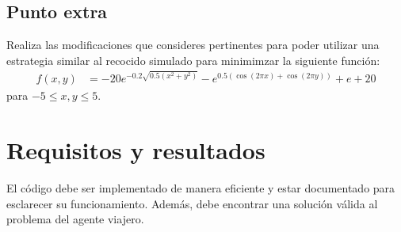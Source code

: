 \subsection{Punto extra}

Realiza las modificaciones que consideres pertinentes para poder utilizar una estrategia similar al recocido simulado para minimimzar la siguiente función:
\begin{align*}
 f(x,y) &= -20 e^{-0.2 \sqrt{0.5(x^2 + y^2)}} - e^{0.5 (\cos(2 \pi x) + \cos(2 \pi y))} + e + 20
\end{align*}
para $-5 \leq x,y \leq 5$.


\section{Requisitos y resultados}

El código debe ser implementado de manera eficiente y estar documentado para esclarecer su funcionamiento.  Además, debe encontrar una solución válida al problema del agente viajero.

